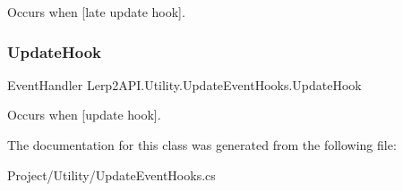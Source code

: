 Occurs when \mbox{[}late update hook\mbox{]}. 

\mbox{\label{class_lerp2_a_p_i_1_1_utility_1_1_update_event_hooks_ad883020c65023c5039dac40800bf9b01}} 
\subsubsection{\texorpdfstring{Update\+Hook}{UpdateHook}}
{\footnotesize\ttfamily Event\+Handler Lerp2\+A\+P\+I.\+Utility.\+Update\+Event\+Hooks.\+Update\+Hook}



Occurs when \mbox{[}update hook\mbox{]}. 



The documentation for this class was generated from the following file\+:\begin{DoxyCompactItemize}
\item 
Project/\+Utility/Update\+Event\+Hooks.\+cs\end{DoxyCompactItemize}
